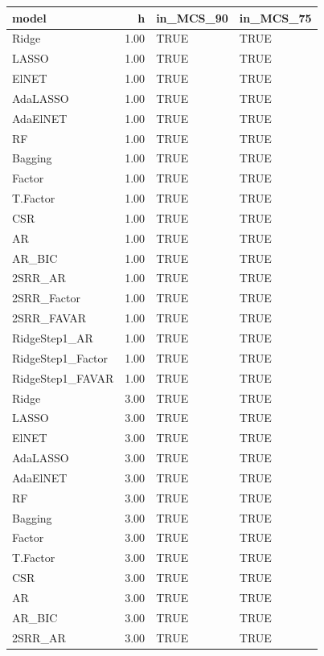 \begin{table}[ht]
\centering
\begin{tabular}{lrll}
  \hline
model & h & in\_MCS\_90 & in\_MCS\_75 \\ 
  \hline
Ridge & 1.00 & TRUE & TRUE \\ 
  LASSO & 1.00 & TRUE & TRUE \\ 
  ElNET & 1.00 & TRUE & TRUE \\ 
  AdaLASSO & 1.00 & TRUE & TRUE \\ 
  AdaElNET & 1.00 & TRUE & TRUE \\ 
  RF & 1.00 & TRUE & TRUE \\ 
  Bagging & 1.00 & TRUE & TRUE \\ 
  Factor & 1.00 & TRUE & TRUE \\ 
  T.Factor & 1.00 & TRUE & TRUE \\ 
  CSR & 1.00 & TRUE & TRUE \\ 
  AR & 1.00 & TRUE & TRUE \\ 
  AR\_BIC & 1.00 & TRUE & TRUE \\ 
  2SRR\_AR & 1.00 & TRUE & TRUE \\ 
  2SRR\_Factor & 1.00 & TRUE & TRUE \\ 
  2SRR\_FAVAR & 1.00 & TRUE & TRUE \\ 
  RidgeStep1\_AR & 1.00 & TRUE & TRUE \\ 
  RidgeStep1\_Factor & 1.00 & TRUE & TRUE \\ 
  RidgeStep1\_FAVAR & 1.00 & TRUE & TRUE \\ 
  Ridge & 3.00 & TRUE & TRUE \\ 
  LASSO & 3.00 & TRUE & TRUE \\ 
  ElNET & 3.00 & TRUE & TRUE \\ 
  AdaLASSO & 3.00 & TRUE & TRUE \\ 
  AdaElNET & 3.00 & TRUE & TRUE \\ 
  RF & 3.00 & TRUE & TRUE \\ 
  Bagging & 3.00 & TRUE & TRUE \\ 
  Factor & 3.00 & TRUE & TRUE \\ 
  T.Factor & 3.00 & TRUE & TRUE \\ 
  CSR & 3.00 & TRUE & TRUE \\ 
  AR & 3.00 & TRUE & TRUE \\ 
  AR\_BIC & 3.00 & TRUE & TRUE \\ 
  2SRR\_AR & 3.00 & TRUE & TRUE \\ 

\end{tabular}
\end{table}
